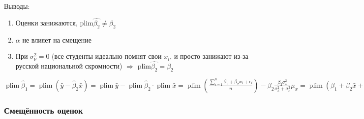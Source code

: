 \documentclass[10pt, a4paper]{extarticle}
\DeclareMathOperator{\plim}{plim}
\begin{document}
Выводы:

\begin{enumerate}
	\item Оценки занижаются, $\text{plim} \hat{\beta_2} \neq \beta_2$
	\item $\alpha$  не влияет на смещение
	\item При $\sigma_\nu^2 = 0$ (все студенты идеально помнят свои $x_i$, и просто занижают из-за русской национальной скромности) $\Rightarrow$ $\text{plim}\hat{\beta_2} = \beta_2$
\end{enumerate}

$\plim \hat{\beta}_1 = \plim (\bar{y} - \hat{\beta}_2\bar{x}) = \plim \bar{y} - \plim \hat{\beta}_2 \cdot \plim \bar{x} = \plim \left( \frac{\sum_{i = 1}^n \beta_1 + \beta_2 x_i + \epsilon_i}{n} \right) - \beta_2 \frac{\beta_2\sigma_x^2}{\sigma_x^2 + \sigma_\nu^2} \mu_x = \plim (\beta_1 + \beta_2\bar{x} + \bar{\epsilon}) -  \beta_2 \frac{\beta_2\sigma_x^2}{\sigma_x^2 + \sigma_\nu^2} \mu_x  = \beta_1 + \beta_2 \mu_x -  \beta_2 \frac{\beta_2\sigma_x^2}{\sigma_x^2 + \sigma_\nu^2} \mu_x = \beta_1 + \frac{\beta_2 \mu_x (\sigma_x^2 + \sigma_v^2) - \beta \sigma_x^2 \mu_x}{\sigma_x^2 + \sigma_\nu^2} = \beta_1 + \frac{\beta_2 \mu_x \sigma_\nu^2}{\sigma_x^2 + \sigma_\nu^2}$

\subsubsection*{Смещённость оценок}
\end{document}
